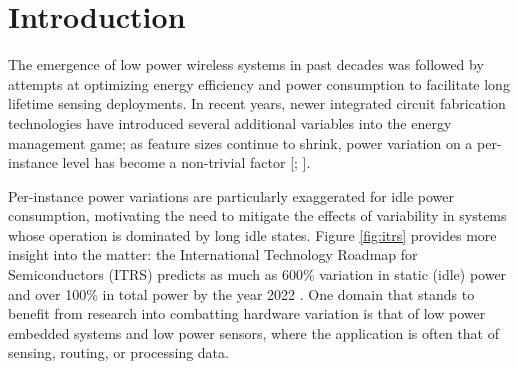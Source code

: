 \section{Introduction}
\label{sec:introduction}

The emergence of low power wireless systems in past decades was followed by attempts at optimizing energy efficiency and power consumption to facilitate long lifetime sensing deployments.  
 In recent years, newer integrated circuit fabrication technologies have introduced several additional variables into the energy management game; as feature sizes continue to shrink, power variation on a per-instance level has become a non-trivial factor [; ]. 



Per-instance power variations are particularly exaggerated for idle power consumption, motivating the need to mitigate the effects of variability in systems whose operation is dominated by long idle states.  Figure \ref{fig:itrs} provides more insight into the matter: the International Technology Roadmap for Semiconductors (ITRS) predicts as much as 600\% variation in static (idle) power and over 100\% in total power by the year 2022 \cite{ITRS}. One domain that stands to benefit from research into combatting hardware variation is that of low power embedded systems and low power sensors, where the application is often that of sensing, routing, or processing data.  

